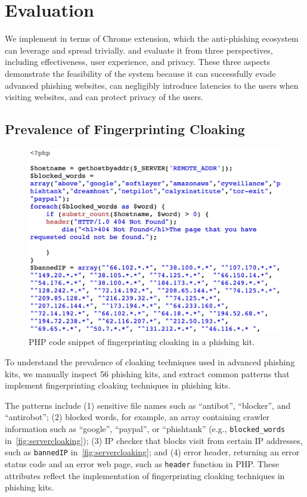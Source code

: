 \section{Evaluation}

We implement \spartacus in terms of Chrome extension, which the anti-phishing ecosystem can leverage and spread trivially.
and evaluate it from three perspectives, including effectiveness, user experience, and privacy.
These three aspects demonstrate the feasibility of the \spartacus system because it can successfully evade advanced phishing websites, can negligibly introduce latencies to the users when visiting websites, and can protect privacy of the users.

\subsection{Prevalence of Fingerprinting Cloaking}

\begin{figure}
\centering
\includegraphics[width=\linewidth]{figs/server_cloaking.png}
\caption{PHP code snippet of fingerprinting cloaking in a phishing kit.}
\label{fig:servercloaking}
\end{figure}

To understand the prevalence of cloaking techniques used in advanced phishing kits, we manually inspect 56 phishing kits, and extract common patterns that implement fingerprinting cloaking techniques in phishing kits.

The patterns include (1) sensitive file names such as ``antibot'', ``blocker'', and ``antirobot''; (2) blocked words, for example, an array containing crawler information such as ``google'', ``paypal'', or ``phishtank'' (e.g., \texttt{blocked\_words} in~\autoref{fig:servercloaking}); (3) IP checker that blocks visit from certain IP addresses, such as \texttt{bannedIP} in~\autoref{fig:servercloaking}; and (4) error header, returning an error status code and an error web page, such as \texttt{header} function in PHP.
These attributes reflect the implementation of fingerprinting cloaking techniques in phishing kits.

